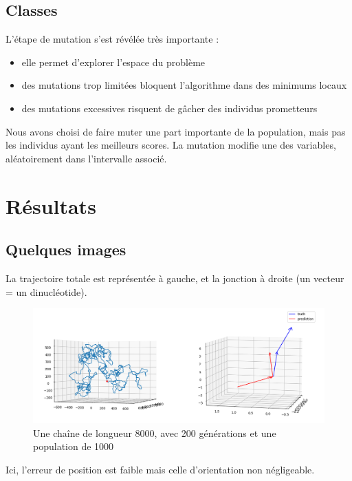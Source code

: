 \documentclass[graphics]{beamer}
\begin{document}
\subsection{Classes} 





\begin{frame}
	L'étape de mutation s'est révélée très importante :
	\begin{itemize}
		\item elle permet d'explorer l'espace du problème 
		\item des mutations trop limitées bloquent l'algorithme dans des minimums locaux
		\item des mutations excessives risquent de gâcher des individus prometteurs
	\end{itemize}
Nous avons choisi de faire muter une part importante de la population, mais pas les individus ayant les meilleurs scores. La mutation modifie une des variables, aléatoirement dans l'intervalle associé.
\end{frame}

\section{Résultats}
\subsection{Quelques images}

\begin{frame}
	La trajectoire totale est représentée à gauche, et la jonction à droite (un vecteur = un dinucléotide).
	\begin{figure}[H]
		\centering
		\includegraphics[scale=0.3]{8k_200gen_1000pop_tour0.3_mut0.7_1.038}
		\caption{Une chaîne de longueur 8000, avec 200 générations et une population de 1000}
	\end{figure}
	Ici, l'erreur de position est faible mais celle d'orientation non négligeable.
\end{frame}
\end{document}
